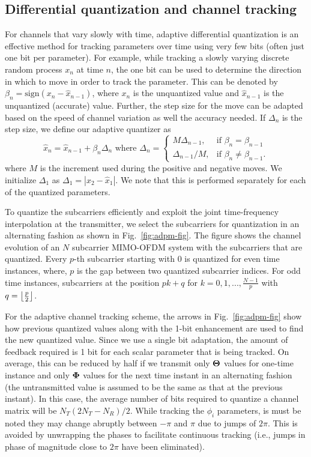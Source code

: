 \documentclass[journal,10pt,twocolumn]{IEEEtran}
\DeclarePairedDelimiter\floor{\lfloor}{\rfloor}
\begin{document}
\subsection{Differential quantization and channel tracking}
\label{quantiz}
For channels that vary slowly with time, adaptive differential
quantization is an effective method for tracking parameters over time
using very few bits (often just one bit per parameter). For example,
while tracking a slowly varying discrete random process $x_n$ at time
$n$, the one bit can be used to determine the direction in which to
move in order to track the parameter. This can be denoted by
$\beta_{n} = \mbox{sign}(x_{n} - \hat{x}_{n-1})$, where $x_n$ is the
unquantized value and $\hat{x}_{n-1}$ is the unquantized (accurate)
value. Further, the step size for the move can be adapted based on the
speed of channel variation as well the accuracy needed. If $\Delta_n$
is the step size, we define our adaptive quantizer as
\begin{equation}
\hat{x}_{n} = \hat{x}_{n-1} + \beta_{n}\Delta_{n} \mbox{ where }
\label{delta_eqn}
\Delta_{n} = \begin{cases}
    M \Delta_{n-1}, & \text{if $\beta_{n} = \beta_{n-1}$}\\
    \Delta_{n-1}/M , & \text{if $\beta_{n} \neq \beta_{n-1}$}.
  \end{cases}
\end{equation}
where $M$ is the increment used during the positive and negative
moves. We initialize $\Delta_1$ as $\Delta_1 = |x_{2}-\hat{x}_1|$. We
note that this is performed separately for each of the quantized
parameters.

To quantize the subcarriers efficiently and exploit the joint
time-frequency interpolation at the transmitter, we select the
subcarriers for quantization in an alternating fashion as shown in
Fig.~\ref{fig:adpm-fig}. The figure shows the channel evolution of an
$N$ subcarrier MIMO-OFDM system with the subcarriers that are
quantized. Every $p$-th subcarrier starting with $0$ is quantized for
even time instances, where, $p$ is the gap between two quantized
subcarrier indices. For odd time instances, subcarriers at the
position $pk+q$ for $k = 0,1,..., \frac{N-1}{p}$ with $q =
{\floor*{\frac{p}{2}}}$.

For the adaptive channel tracking scheme, the arrows in
Fig.~\ref{fig:adpm-fig} show how previous quantized values along with
the 1-bit enhancement are used to find the new quantized value. Since
we use a single bit adaptation, the amount of feedback required is 1
bit for each scalar parameter that is being tracked. On average, this
can be reduced by half if we transmit only $\bf{\Theta}$ values for
one-time instance and only $\bf{\Phi}$ values for the next time
instant in an alternating fashion (the untransmitted value is assumed
to be the same as that at the previous instant). In this case, the
average number of bits required to quantize a channel matrix will be
$N_{T}(2N_{T} - N_{R})/2$. While tracking the $\phi_i$ parameters, is
must be noted they may change abruptly between $-\pi$ and $\pi$ due to
jumps of $2\pi$. This is avoided by unwrapping the phases to
facilitate continuous tracking (i.e., jumps in phase of
magnitude close to $2\pi$ have been eliminated).
\end{document}
